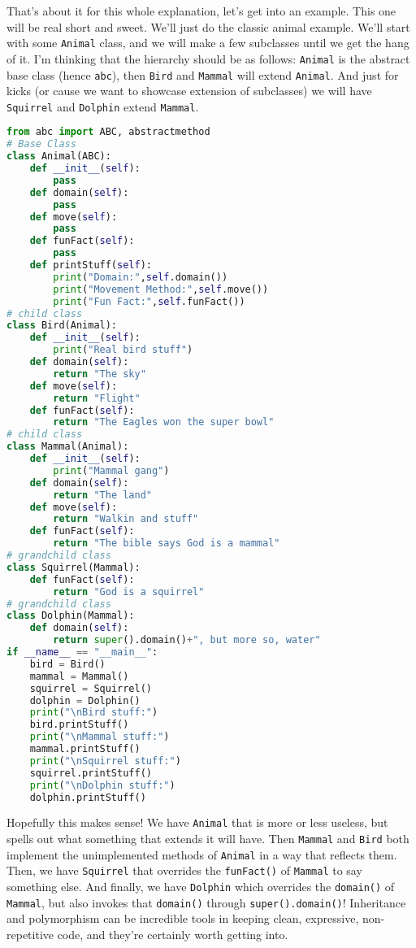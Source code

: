 \documentclass[12pt, twoside, reqno]{book}
\begin{document}
That's about it for this whole explanation, let's get into an example. This one will be real short and sweet. We'll just do the classic animal example. We'll start with some \texttt{Animal} class, and we will make a few subclasses until we get the hang of it. I'm thinking that the hierarchy should be as follows: \texttt{Animal} is the abstract base class (hence \texttt{abc}), then \texttt{Bird} and \texttt{Mammal} will extend \texttt{Animal}. And just for kicks (or cause we want to showcase extension of subclasses) we will have \texttt{Squirrel} and \texttt{Dolphin} extend \texttt{Mammal}.
\begin{lstlisting}[language=Python]
from abc import ABC, abstractmethod 
# Base Class
class Animal(ABC):
    def __init__(self):
        pass
    def domain(self):
        pass
    def move(self):
        pass
    def funFact(self):
        pass
    def printStuff(self):
        print("Domain:",self.domain())
        print("Movement Method:",self.move())
        print("Fun Fact:",self.funFact())
# child class
class Bird(Animal):
    def __init__(self):
        print("Real bird stuff")
    def domain(self):
        return "The sky"
    def move(self):
        return "Flight"
    def funFact(self):
        return "The Eagles won the super bowl"
# child class
class Mammal(Animal):
    def __init__(self):
        print("Mammal gang")
    def domain(self):
        return "The land"
    def move(self):
        return "Walkin and stuff"
    def funFact(self):
        return "The bible says God is a mammal"
# grandchild class
class Squirrel(Mammal):
    def funFact(self):
        return "God is a squirrel"
# grandchild class
class Dolphin(Mammal):
    def domain(self):
        return super().domain()+", but more so, water"
if __name__ == "__main__":
    bird = Bird()
    mammal = Mammal()
    squirrel = Squirrel()
    dolphin = Dolphin()
    print("\nBird stuff:")
    bird.printStuff()
    print("\nMammal stuff:")
    mammal.printStuff()
    print("\nSquirrel stuff:")
    squirrel.printStuff()
    print("\nDolphin stuff:")
    dolphin.printStuff()
\end{lstlisting}

Hopefully this makes sense! We have \texttt{Animal} that is more or less useless, but spells out what something that extends it will have. Then \texttt{Mammal} and \texttt{Bird} both implement the unimplemented methods of \texttt{Animal} in a way that reflects them. Then, we have \texttt{Squirrel} that overrides the \texttt{funFact()} of \texttt{Mammal} to say something else. And finally, we have \texttt{Dolphin} which overrides the \texttt{domain()} of \texttt{Mammal}, but also invokes that \texttt{domain()} through \texttt{super().domain()}! Inheritance and polymorphism can be incredible tools in keeping clean, expressive, non-repetitive code, and they're certainly worth getting into.
\end{document}
